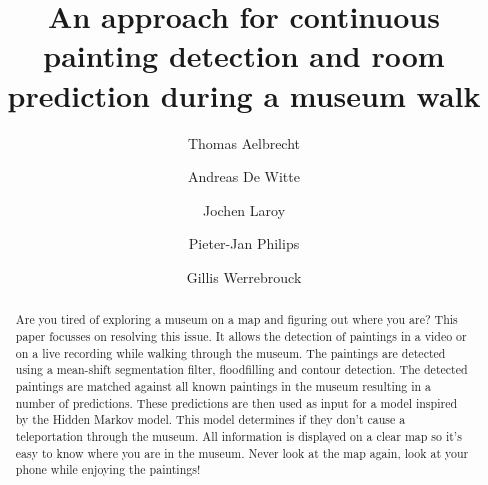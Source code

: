 \documentclass[runningheads]{llncs}
\begin{document}
\title{An approach for continuous painting detection and room prediction during a museum walk}
%
%
\author{
    Thomas Aelbrecht \and
    Andreas De Witte \and
    Jochen Laroy \and
    Pieter-Jan Philips \and
    Gillis Werrebrouck
}


%
%
\maketitle              %
%
\begin{abstract}

Are you tired of exploring a museum on a map and figuring out where you are? This paper focusses on resolving this issue. It allows the detection of paintings in a video or on a live recording while walking through the museum. The paintings are detected using a mean-shift segmentation filter, floodfilling and contour detection. The detected paintings are matched against all known paintings in the museum resulting in a number of predictions. These predictions are then used as input for a model inspired by the Hidden Markov model. This model determines if they don't cause a teleportation through the museum. All information is displayed on a clear map so it's easy to know where you are in the museum. Never look at the map again, look at your phone while enjoying the paintings!

\end{abstract}
%









%
%
%


\end{document}
